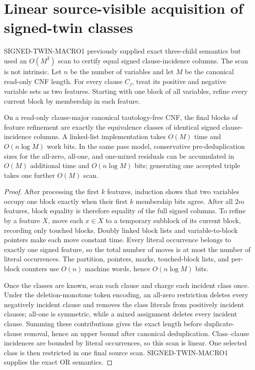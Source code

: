 \section{Linear source-visible acquisition of signed-twin classes}
SIGNED-TWIN-MACRO1 previously supplied exact three-child semantics but used
an $O(M^3)$ scan to certify equal signed clause-incidence columns.  The scan
is not intrinsic.  Let $n$ be the number of variables and let $M$ be the
canonical read-only CNF length.  For every clause $C_j$, treat its positive
and negative variable sets as two features.  Starting with one block of all
variables, refine every current block by membership in each feature.

\begin{theorem}
On a read-only clause-major canonical tautology-free CNF, the final blocks of
feature refinement are exactly the equivalence classes of identical signed
clause-incidence columns.  A linked-list implementation takes $O(M)$ time and
$O(n\log M)$ work bits.  In the same pass model, conservative pre-deduplication
sizes for the all-zero, all-one, and one-mixed residuals can be accumulated in
$O(M)$ additional time and $O(n\log M)$ bits; generating one accepted triple
takes one further $O(M)$ scan.
\end{theorem}
\begin{proof}
After processing the first $k$ features, induction shows that two variables
occupy one block exactly when their first $k$ membership bits agree.  After
all $2m$ features, block equality is therefore equality of the full signed
columns.  To refine by a feature $X$, move each $x\in X$ to a temporary
subblock of its current block, recording only touched blocks.  Doubly linked
block lists and variable-to-block pointers make each move constant time.
Every literal occurrence belongs to exactly one signed feature, so the total
number of moves is at most the number of literal occurrences.  The partition,
pointers, marks, touched-block lists, and per-block counters use $O(n)$
machine words, hence $O(n\log M)$ bits.

Once the classes are known, scan each clause and charge each incident class
once.  Under the deletion-monotone token encoding, an all-zero restriction
deletes every negatively incident clause and removes the class literals from
positively incident clauses; all-one is symmetric, while a mixed assignment
deletes every incident clause.  Summing these contributions gives the exact
length before duplicate-clause removal, hence an upper bound after canonical
deduplication.  Class--clause incidences are bounded by literal occurrences,
so this scan is linear.  One selected class is then restricted in one final
source scan.  SIGNED-TWIN-MACRO1 supplies the exact OR semantics.
\end{proof}

